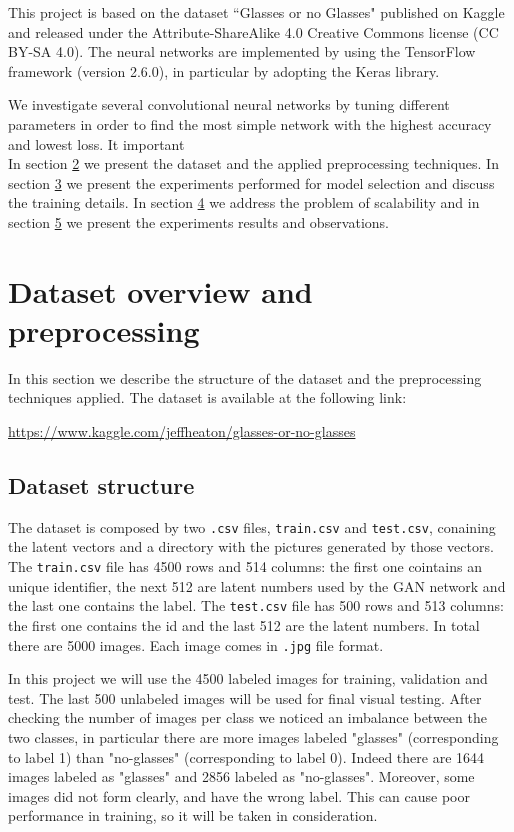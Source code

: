 \documentclass{article}
\begin{document}
This project is based on the dataset ``Glasses or no Glasses" published on Kaggle and released under the Attribute-ShareAlike 4.0 Creative Commons license (CC BY-SA 4.0). The neural networks are implemented by using the TensorFlow framework (version 2.6.0), in particular by adopting the Keras library.

We investigate several convolutional neural networks by tuning different parameters in order to find the most simple network with the highest accuracy and lowest loss. It important \\
In section \hyperref[sec:dataset]{2} we present the dataset and the applied preprocessing techniques. In section  \hyperref[sec:cnn]{3} we present the  experiments performed for model selection and discuss the training details. In section \hyperref[sec:cnn]{4} we address the problem of scalability and in section \hyperref[sec:cnn]{5} we present the experiments results and observations.


\section{Dataset overview and preprocessing}
\label{sec:dataset}
In this section we describe the structure of the dataset and the preprocessing techniques applied. The dataset is available at the following link: 
\begin{center}
    \url{https://www.kaggle.com/jeffheaton/glasses-or-no-glasses}
\end{center} 
\subsection{Dataset structure}
The dataset is composed by two \texttt{.csv} files, \texttt{train.csv} and \texttt{test.csv}, conaining the latent vectors and a directory with the pictures generated by those vectors. The \texttt{train.csv} file has 4500 rows and 514 columns: the first one cointains an  unique identifier, the next 512 are latent numbers used by the GAN network and the last one contains the label. The \texttt{test.csv} file has 500 rows and 513 columns: the first one contains the id and the last 512 are the latent numbers. In total there are 5000 images. Each image comes in \texttt{.jpg} file format.

In this project we will use the 4500 labeled images for training, validation and test. The last 500 unlabeled images will be used for final visual testing.
After checking the number of images per class we noticed an imbalance between the two classes, in particular there are more images labeled "glasses" (corresponding to label 1) than "no-glasses" (corresponding to label 0). Indeed there are 1644 images labeled as "glasses" and 2856 labeled as "no-glasses". Moreover, some images did not form clearly, and have the wrong label. This can cause poor performance in training, so it will be taken in consideration.
\end{document}
